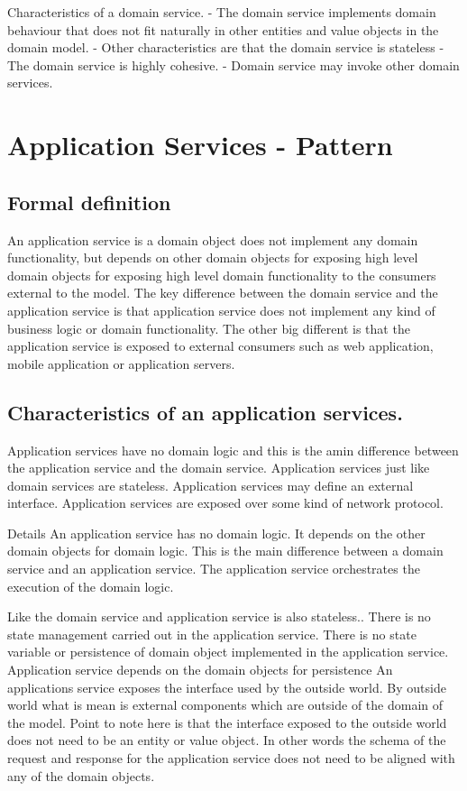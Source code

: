 \documentclass[a4paper, 11pt]{book}
\begin{document}
    Characteristics of a domain service.
    - The domain service implements domain behaviour that does not fit naturally in other entities and value objects in the domain model.
    - Other characteristics are that the domain service is stateless
    - The domain service is highly cohesive.
    - Domain service may invoke other domain services.


    \section{Application Services - Pattern}
    \subsection{Formal definition}
    An application service is a domain object does not implement any domain functionality,
    but depends on other domain objects for exposing high level domain objects for exposing high level domain functionality to the consumers external to the model.
    The key difference between the domain service and the application service is that application service does not implement any kind of business logic or domain functionality.
    The other big different is that the application service is exposed to external consumers such as web application, mobile application or application servers.

    \subsection{Characteristics of an application services.}
    Application services have no domain logic and this is the amin difference between the application service and the domain service.
    Application services just like domain services are stateless.
    Application services may define an external interface.
    Application services are exposed over some kind of network protocol.

    Details
    An application service has no domain logic. It depends on the other domain objects for domain logic.
    This is the main difference between a domain service and an application service.
    The application service orchestrates the execution of the domain logic.

    Like the domain service and application service is also stateless..
    There is no state management carried out in the application service.
    There is no state variable or persistence of domain object implemented in the application service.
    Application service depends on the domain objects for persistence
    An applications service exposes the interface used by the outside world.
    By outside world what is mean is external components which are outside of the domain of the model.
    Point to note here is that the interface exposed to the outside world does not need to be an entity or value object.
    In other words the schema of the request and response for the application service does not need to be aligned with any of the domain objects.
\end{document}
